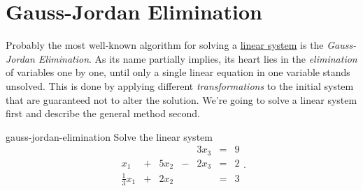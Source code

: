 \section{Gauss-Jordan Elimination}
\label{sec:gauss-jordan-elimination}

Probably the most well-known algorithm for solving a
\hyperref[def:linear-system]{linear system} is the \emph{Gauss-Jordan
Elimination}. As its name partially implies, its heart lies in the
\emph{elimination} of variables one by one, until only a single linear equation
in one variable stands unsolved. This is done by applying different
\emph{transformations} to the initial system that are guaranteed not to alter
the solution. We're going to solve a linear system first and describe the
general method second.

\begin{problem}{}{gauss-jordan-elimination}
 Solve the linear system
 \[
  \begin{array}{rcrcrcr}
   & & & & 3x_3 & = & 9\\
   x_1 & + & 5x_2 & - & 2x_3 & = & 2\\
   \frac{1}{3}x_1 & + & 2x_2 & & & = & 3
  \end{array}.
 \]
\end{problem}
